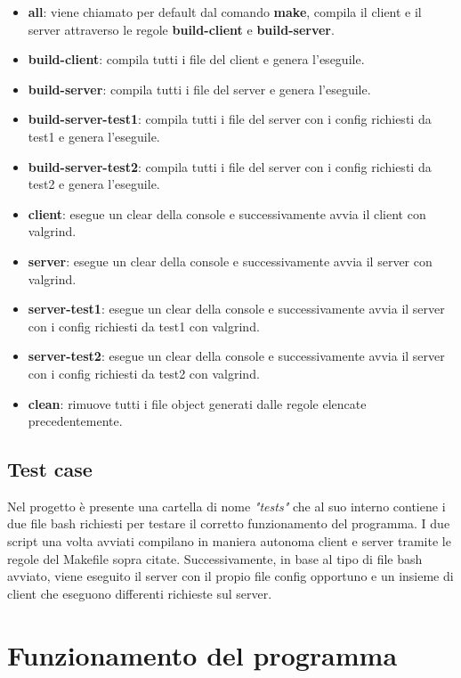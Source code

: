 \documentclass{article}
\begin{document}
\begin{itemize}
    \itemsep 0em 
    \item \textbf{all}: viene chiamato per default dal comando \textbf{make}, compila il client e il server attraverso le regole \textbf{build-client} e \textbf{build-server}. 
    \item \textbf{build-client}: compila tutti i file del client e genera l'eseguile.
    \item \textbf{build-server}: compila tutti i file del server e genera l'eseguile.
    \item \textbf{build-server-test1}: compila tutti i file del server con i config richiesti da test1 e genera l'eseguile.
    \item \textbf{build-server-test2}: compila tutti i file del server con i config richiesti da test2 e genera l'eseguile.
    \item \textbf{client}: esegue un clear della console e successivamente avvia il client con valgrind.
    \item \textbf{server}: esegue un clear della console e successivamente avvia il server con valgrind.
    \item \textbf{server-test1}: esegue un clear della console e successivamente avvia il server con i config richiesti da test1 con valgrind.
    \item \textbf{server-test2}: esegue un clear della console e successivamente avvia il server con i config richiesti da test2 con valgrind.
    \item \textbf{clean}: rimuove tutti i file object generati dalle regole elencate precedentemente.
\end{itemize}

\subsection{Test case}
Nel progetto è presente una cartella di nome \textit{"tests"} che al suo interno contiene i due file bash richiesti per testare il corretto
funzionamento del programma. I due script una volta avviati compilano in maniera autonoma client e server tramite le regole del Makefile sopra citate. Successivamente,
in base al tipo di file bash avviato, viene eseguito il server con il propio file config opportuno e un insieme di client che eseguono differenti richieste sul server.

\section{Funzionamento del programma}
\end{document}

